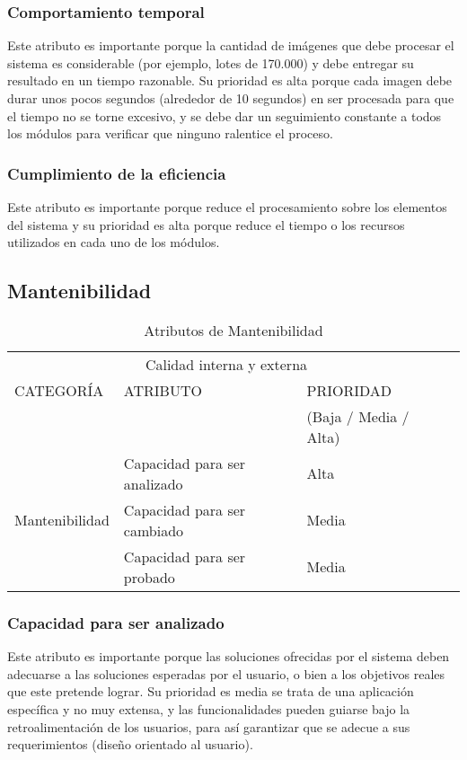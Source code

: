 \documentclass[12pt]{article}
\begin{document}
\subsubsection{Comportamiento temporal}
\vspace*{0.2in}
Este atributo es importante porque la cantidad de imágenes que debe procesar el sistema es considerable (por ejemplo, lotes de 170.000) y debe entregar su resultado en un tiempo razonable. Su prioridad es alta porque cada imagen debe durar unos pocos segundos (alrededor de 10 segundos) en ser procesada para que el tiempo no se torne excesivo, y se debe dar un seguimiento constante a todos los módulos para verificar que ninguno ralentice el proceso.
\subsubsection{Cumplimiento de la eficiencia}
\vspace*{0.2in}
Este atributo es importante porque reduce el procesamiento sobre los elementos del sistema y su prioridad es alta porque reduce el tiempo o los recursos utilizados en cada uno de los módulos.\\[3 cm]

\vspace*{0.3in}

\subsection{Mantenibilidad}
\vspace*{0.3in}
\begin{table}[htb]%
\centering
\begin{tabular}{|l|l|l|l|}
\hline
\multicolumn{3}{|c|}{Calidad interna y externa   } \\
\cline{1-3}
CATEGORÍA & ATRIBUTO & PRIORIDAD\\ & & (Baja / Media / Alta)\\
\hline \hline
\multirow{3}{3cm}{Mantenibilidad} & Capacidad para ser analizado & Alta \\ \cline{2-3}
& Capacidad para ser cambiado &  Media\\ \cline{2-3}
& Capacidad para ser probado & Media\\ \cline{1-3}
\end{tabular}
\caption{Atributos de Mantenibilidad}
\label{tabla:final}
\end{table}%
\subsubsection{Capacidad para ser analizado}
\vspace*{0.2in}
Este atributo es importante porque las soluciones ofrecidas por el sistema deben adecuarse a las soluciones esperadas por el usuario, o bien a los objetivos reales que este pretende lograr. Su prioridad es media se trata de una aplicación específica y no muy extensa, y las funcionalidades pueden guiarse bajo la retroalimentación de los usuarios, para así garantizar que se adecue a sus requerimientos (diseño orientado al usuario).
\end{document}
